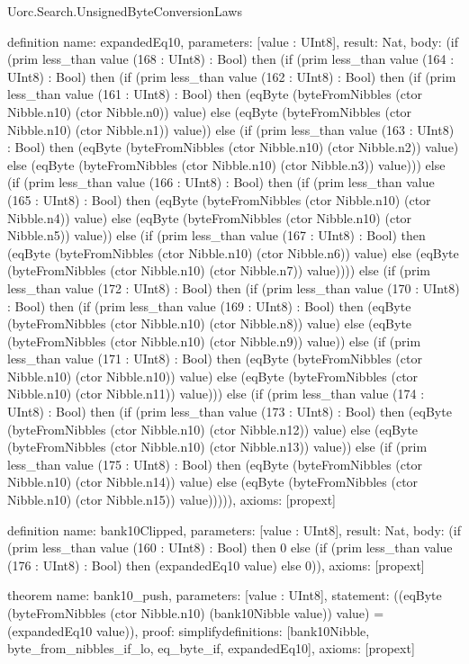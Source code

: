 \begin{lexlean}{Uorc.Search.UnsignedByteConversionLaws}
\begin{semanticmodule}
definition{
  name: expandedEq10,
  parameters: [value : UInt8],
  result: Nat,
  body: (if (prim less_than value (168 : UInt8) : Bool) then (if (prim less_than value (164 : UInt8) : Bool) then (if (prim less_than value (162 : UInt8) : Bool) then (if (prim less_than value (161 : UInt8) : Bool) then (eqByte (byteFromNibbles (ctor Nibble.n10) (ctor Nibble.n0)) value) else (eqByte (byteFromNibbles (ctor Nibble.n10) (ctor Nibble.n1)) value)) else (if (prim less_than value (163 : UInt8) : Bool) then (eqByte (byteFromNibbles (ctor Nibble.n10) (ctor Nibble.n2)) value) else (eqByte (byteFromNibbles (ctor Nibble.n10) (ctor Nibble.n3)) value))) else (if (prim less_than value (166 : UInt8) : Bool) then (if (prim less_than value (165 : UInt8) : Bool) then (eqByte (byteFromNibbles (ctor Nibble.n10) (ctor Nibble.n4)) value) else (eqByte (byteFromNibbles (ctor Nibble.n10) (ctor Nibble.n5)) value)) else (if (prim less_than value (167 : UInt8) : Bool) then (eqByte (byteFromNibbles (ctor Nibble.n10) (ctor Nibble.n6)) value) else (eqByte (byteFromNibbles (ctor Nibble.n10) (ctor Nibble.n7)) value)))) else (if (prim less_than value (172 : UInt8) : Bool) then (if (prim less_than value (170 : UInt8) : Bool) then (if (prim less_than value (169 : UInt8) : Bool) then (eqByte (byteFromNibbles (ctor Nibble.n10) (ctor Nibble.n8)) value) else (eqByte (byteFromNibbles (ctor Nibble.n10) (ctor Nibble.n9)) value)) else (if (prim less_than value (171 : UInt8) : Bool) then (eqByte (byteFromNibbles (ctor Nibble.n10) (ctor Nibble.n10)) value) else (eqByte (byteFromNibbles (ctor Nibble.n10) (ctor Nibble.n11)) value))) else (if (prim less_than value (174 : UInt8) : Bool) then (if (prim less_than value (173 : UInt8) : Bool) then (eqByte (byteFromNibbles (ctor Nibble.n10) (ctor Nibble.n12)) value) else (eqByte (byteFromNibbles (ctor Nibble.n10) (ctor Nibble.n13)) value)) else (if (prim less_than value (175 : UInt8) : Bool) then (eqByte (byteFromNibbles (ctor Nibble.n10) (ctor Nibble.n14)) value) else (eqByte (byteFromNibbles (ctor Nibble.n10) (ctor Nibble.n15)) value))))),
  axioms: [propext]
}

definition{
  name: bank10Clipped,
  parameters: [value : UInt8],
  result: Nat,
  body: (if (prim less_than value (160 : UInt8) : Bool) then 0 else (if (prim less_than value (176 : UInt8) : Bool) then (expandedEq10 value) else 0)),
  axioms: [propext]
}

theorem{
  name: bank10_push,
  parameters: [value : UInt8],
  statement: ((eqByte (byteFromNibbles (ctor Nibble.n10) (bank10Nibble value)) value) = (expandedEq10 value)),
  proof: simplify{definitions: [bank10Nibble, byte_from_nibbles_if_lo, eq_byte_if, expandedEq10]},
  axioms: [propext]
}


\end{semanticmodule}
\end{lexlean}
